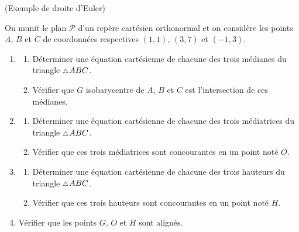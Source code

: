 \documentclass[a4paper,12pt,reqno]{amsart}
\begin{document}
\begin{exo} (Exemple de droite d'Euler)

  On munit le plan $\mathcal{P}$ d'un repère cartésien orthonormal et on considère les points $A$, $B$ et $C$ de coordonnées respectives $(1, 1)$, $(3, 7)$ et $(−1, 3)$.
  \begin{enumerate}
    \item
      \begin{enumerate}
        \item Déterminer une équation cartésienne de chacune des trois médianes du triangle $\tri ABC$.
        \item Vérifier que $G$ isobarycentre de $A$, $B$ et $C$ est l'intersection de ces médianes.
      \end{enumerate}
    \item
      \begin{enumerate}
        \item Déterminer une équation cartésienne de chacune des trois médiatrices du triangle $\tri ABC$.
        \item Vérifier que ces trois médiatrices sont concourantes en un point noté $O$.
      \end{enumerate}
    \item
      \begin{enumerate}
        \item Déterminer une équation cartésienne de chacune des trois hauteurs du triangle $\tri ABC$.
        \item Vérifier que ces trois hauteurs sont concourantes en un point noté $H$.
      \end{enumerate}
    \item Vérifier que les points $G$, $O$ et $H$ sont alignés.
  \end{enumerate}

\end{exo}
\end{document}
